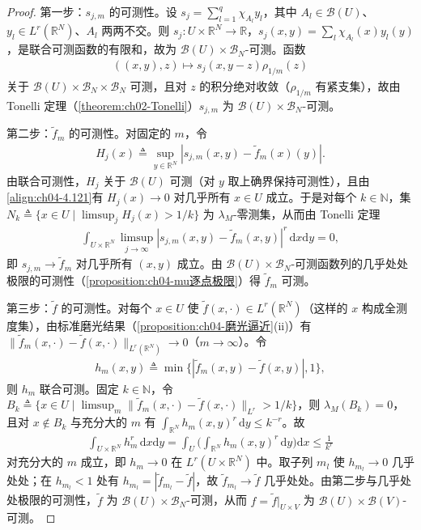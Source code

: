 \documentclass[../../main.tex]{subfiles}%
\begin{document}
\begin{proof}
第一步：$s_{j,m}$ 的可测性。设 $s_j=\sum_{l=1}^{q}\chi_{A_l}y_l$，其中 $A_l\in\mathcal{B}(U)$、$y_l\in L^r(\mathbb{R}^N)$、$A_l$ 两两不交。则 $s_j:U\times\mathbb{R}^N\to\mathbb{R}$，$s_j(x,y)=\sum_l\chi_{A_l}(x)y_l(y)$，是联合可测函数的有限和，故为 $\mathcal{B}(U)\times\mathcal{B}_N$-可测。函数
\begin{align*}
((x,y),z)\mapsto s_j(x,y-z)\rho_{1/m}(z)
\end{align*}
关于 $\mathcal{B}(U)\times\mathcal{B}_N\times\mathcal{B}_N$ 可测，且对 $z$ 的积分绝对收敛（$\rho_{1/m}$ 有紧支集），故由 Tonelli 定理（\cref{theorem:ch02-Tonelli}）$s_{j,m}$ 为 $\mathcal{B}(U)\times\mathcal{B}_N$-可测。

第二步：$\tilde f_m$ 的可测性。对固定的 $m$，令
\begin{align*}
H_{j}(x)\triangleq\sup_{y\in\mathbb{R}^N}|s_{j,m}(x,y)-\tilde f_m(x)(y)| .
\end{align*}
由联合可测性，$H_j$ 关于 $\mathcal{B}(U)$ 可测（对 $y$ 取上确界保持可测性），且由\eqref{align:ch04-4.121}有 $H_j(x)\to0$ 对几乎所有 $x\in U$ 成立。于是对每个 $k\in\mathbb{N}$，集 $N_{k}\triangleq\{x\in U\mid\limsup_jH_j(x)>1/k\}$ 为 $\lambda_M$-零测集，从而由 Tonelli 定理
\begin{align*}
\int_{U\times\mathbb{R}^N}\limsup_{j\to\infty}|s_{j,m}(x,y)-\tilde f_m(x,y)|^r\,\mathrm{d}x\mathrm{d}y=0,
\end{align*}
即 $s_{j,m}\to\tilde f_m$ 对几乎所有 $(x,y)$ 成立。由 $\mathcal{B}(U)\times\mathcal{B}_N$-可测函数列的几乎处处极限的可测性（\cref{proposition:ch04-mu逐点极限}）得 $\tilde f_m$ 可测。

第三步：$\tilde f$ 的可测性。对每个 $x\in U$ 使 $\tilde f(x,\cdot)\in L^r(\mathbb{R}^N)$（这样的 $x$ 构成全测度集），由标准磨光结果（\cref{proposition:ch04-磨光逼近}(ii)）有 $\|\tilde f_m(x,\cdot)-\tilde f(x,\cdot)\|_{L^r(\mathbb{R}^N)}\to0$（$m\to\infty$）。令
\begin{align*}
h_m(x,y)\triangleq\min\{|\tilde f_m(x,y)-\tilde f(x,y)|,1\},
\end{align*}
则 $h_m$ 联合可测。固定 $k\in\mathbb{N}$，令 $B_k\triangleq\{x\in U\mid\limsup_m\|\tilde f_m(x,\cdot)-\tilde f(x,\cdot)\|_{L^r}>1/k\}$，则 $\lambda_M(B_k)=0$，且对 $x\notin B_k$ 与充分大的 $m$ 有 $\int_{\mathbb{R}^N}h_m(x,y)^r\,\mathrm{d}y\leqslant k^{-r}$。故
\begin{align*}
\int_{U\times\mathbb{R}^N}h_m^r\,\mathrm{d}x\mathrm{d}y=\int_U\Big(\int_{\mathbb{R}^N}h_m(x,y)^r\,\mathrm{d}y\Big)\mathrm{d}x\leqslant\frac1{k^r}
\end{align*}
对充分大的 $m$ 成立，即 $h_m\to0$ 在 $L^r(U\times\mathbb{R}^N)$ 中。取子列 $m_l$ 使 $h_{m_l}\to0$ 几乎处处；在 $h_{m_l}<1$ 处有 $h_{m_l}=|\tilde f_{m_l}-\tilde f|$，故 $\tilde f_{m_l}\to\tilde f$ 几乎处处。由第二步与几乎处处极限的可测性，$\tilde f$ 为 $\mathcal{B}(U)\times\mathcal{B}_N$-可测，从而 $f=\tilde f|_{U\times V}$ 为 $\mathcal{B}(U)\times\mathcal{B}(V)$-可测。


\end{proof}
\end{document}

